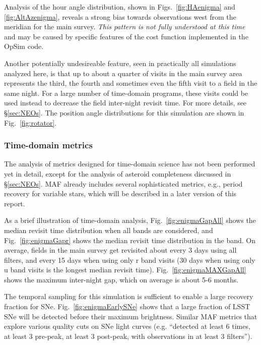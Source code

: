 \documentclass[manuscript]{article}
\begin{document}
Analysis of the hour angle
distribution, shown in Figs.~\ref{fig:HAenigma} and \ref{fig:AltAzenigma}, reveals a strong bias towards 
observations west from the meridian for the main survey. {\it This pattern is not fully understood at this time} 
and may be caused by specific features of the cost function implemented in the OpSim code. 

Another potentially undesireable feature, seen in practically all simulations analyzed here,
is that up to about a quarter of visits in the main survey area represents the third, the fourth 
and sometimes even the fifth visit to a field in the same night. For a large number of time-domain
programs, these visits could be used instead to decrease the field inter-night revisit time. 
For more details, see \S\ref{sec:NEOs}. The position angle distributions for this simulation 
are shown in Fig.~\ref{fig:rotator}. 


\subsubsection{Time-domain metrics} 

The analysis of metrics designed for time-domain science has not been performed yet
in detail, except for the analysis of asteroid completeness discussed in \S\ref{sec:NEOs}. 
MAF already includes several sophisticated metrics, e.g., period recovery for variable stars, 
which will be described in a later version of this report. 

As a brief illustration of time-domain analysis, Fig.~\ref{fig:enigmaGapAll} shows the median 
revisit time distribution when all bands are considered, and Fig.~\ref{fig:enigmaGapr} shows 
the median revisit time distribution in the band.  On average, fields in the main survey get 
revisited about every 3 days using all filters, and every 15 days when using only r band visits 
(30 days when using only u band visits is the longest median revisit time). Fig.~\ref{fig:enigmaMAXGapAll} 
shows the maximum inter-night gap, which on average is about 5-6 months. 

The temporal sampling for this simulation is sufficient to enable a large recovery fraction for SNe. 
Fig.~\ref{fig:enigmaEarlySNe} shows that a large fraction of LSST SNe will be detected before their 
maximum brightness. Similar MAF metrics that explore various quality cuts on SNe light 
curves (e.g. ``detected at least 6 times, at least 3 pre-peak, at least 3 post-peak, with observations 
in at least 3 filters''). 
\end{document}
